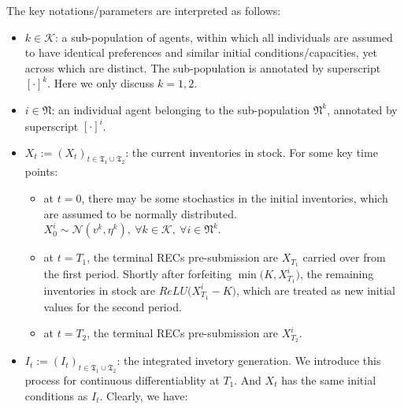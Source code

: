 \documentclass{article}
\begin{document}
The key notations/parameters are interpreted as follows:

\begin{itemize}
\item
  \(k \in \mathcal{K}\): a sub-population of agents, within which all
  individuals are assumed to have identical preferences and similar
  initial conditions/capacities, yet across which are distinct. The
  sub-population is annotated by superscript \([\cdot]^{k}\). Here we
  only discuss \(k=1,2\).
\item
  \(i \in \mathfrak{N}\): an individual agent belonging to the
  sub-population \(\mathfrak{N}^k\), annotated by superscript
  \([\cdot]^{i}\).
\item
  \(X_t := (X_t)_{t\in\mathfrak{T_1} \cup \mathfrak{T_2}}\): the current
  inventories in stock. For some key time points:

  \begin{itemize}
  \tightlist
  \item
    at \(t=0\), there may be some stochastics in the initial
    inventories, which are assumed to be normally distributed.
    \(X_0^{i} \sim \mathcal{N}(v^k, \eta^k) ,~ \forall k \in \mathcal{K},~\forall i \in \mathfrak{N}^k\).
  \item
    at \(t=T_1\), the terminal RECs pre-submission are \(X_{T_1}\)
    carried over from the first period. Shortly after forfeiting
    \(\min\Big(K,X^i_{T_1}\Big)\), the remaining inventories in stock
    are \(ReLU\Big(X^i_{T_1}-K\Big)\), which are treated as new initial
    values for the second period.
  \item
    at \(t=T_2\), the terminal RECs pre-submission are \(X^i_{T_2}\).
  \end{itemize}
\item
  \(I_t := (I_t)_{t\in\mathfrak{T_1} \cup \mathfrak{T_2}}\): the
  integrated invetory generation. We introduce this process for
  continuous differentiablity at \(T_1\). And \(X_t\) has the same
  initial conditions as \(I_t\). Clearly, we have:


\end{itemize}
\end{document}
